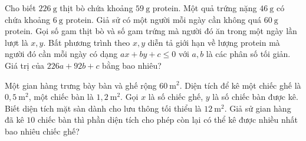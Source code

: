 \begin{ex}%
	Cho biết $226\mathrm{~g}$ thịt bò chứa khoảng $59\mathrm{~g}$ protein. Một quả trứng nặng $46\mathrm{~g}$ có chứa khoảng 
	$6\mathrm{~g}$ protein. Giả sử có một người mỗi ngày cần không quá $60\mathrm{~g}$ protein. Gọi số gam thịt bò và số gam trứng mà người đó ăn trong một ngày lần lượt là $x,y$. Bất phương trình theo $x,y$ diễn tả giới hạn về lượng protein mà người đó cần mỗi ngày có dạng $ax+by+c\le 0$ với $a, b$ là các phân số tối giản. Giá trị của $226a+92b+c$ bằng bao nhiêu?
\end{ex}

\begin{ex}%
	Một gian hàng trưng bày bàn và ghế rộng $60\mathrm{~m^2}$. Diện tích để kê một chiếc ghế là $0{,}5\mathrm{~m^2}$, một chiếc bàn là $1{,}2\mathrm{~m^2}$. Gọi $x$ là số chiếc ghế, $y$ là số chiếc bàn được kê. Biết diện tích mặt sàn dành cho lưu thông tối thiểu là $12\mathrm{~m^2}$. Giả sử gian hàng đã kê $10$ chiếc bàn thì phần diện tích cho phép còn lại có thể kê được nhiều nhất bao nhiêu chiếc ghế?
\end{ex}

